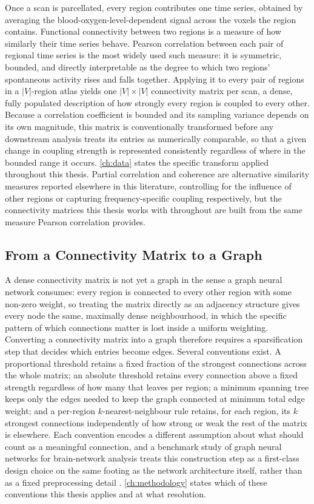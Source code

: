 Once a scan is parcellated, every region contributes one time series, obtained by
averaging the blood-oxygen-level-dependent signal across the voxels the region contains.
Functional connectivity between two regions is a measure of how similarly their time
series behave. Pearson correlation between each pair of regional time series is the most
widely used such measure: it is symmetric, bounded, and directly interpretable as the
degree to which two regions' spontaneous activity rises and falls together. Applying it to
every pair of regions in a $|V|$-region atlas yields one $|V| \times |V|$ connectivity
matrix per scan, a dense, fully populated description of how strongly every region is
coupled to every other. Because a correlation coefficient is bounded and its sampling
variance depends on its own magnitude, this matrix is conventionally transformed before
any downstream analysis treats its entries as numerically comparable, so that a given
change in coupling strength is represented consistently regardless of where in the bounded
range it occurs. \autoref{ch:data} states the specific transform applied throughout this
thesis. Partial correlation and coherence are alternative similarity measures reported
elsewhere in this literature, controlling for the influence of other regions or capturing
frequency-specific coupling respectively, but the connectivity matrices this thesis works
with throughout are built from the same measure Pearson correlation provides.

\subsection{From a Connectivity Matrix to a Graph}\label{sec:graph-construction-background}

A dense connectivity matrix is not yet a graph in the sense a graph neural network
consumes: every region is connected to every other region with some non-zero weight, so
treating the matrix directly as an adjacency structure gives every node the same,
maximally dense neighbourhood, in which the specific pattern of which connections matter
is lost inside a uniform weighting. Converting a connectivity matrix into a graph
therefore requires a sparsification step that decides which entries become edges. Several
conventions exist. A proportional threshold retains a fixed fraction of the strongest
connections across the whole matrix; an absolute threshold retains every connection above
a fixed strength regardless of how many that leaves per region; a minimum spanning tree
keeps only the edges needed to keep the graph connected at minimum total edge weight; and a
per-region $k$-nearest-neighbour rule retains, for each region, its $k$ strongest
connections independently of how strong or weak the rest of the matrix is elsewhere. Each
convention encodes a different assumption about what should count as a meaningful
connection, and a benchmark study of graph neural networks for brain-network analysis
treats this construction step as a first-class design choice on the same footing as the
network architecture itself, rather than as a fixed preprocessing detail
\parencite{cui2023braingb}. \autoref{ch:methodology} states which of these conventions this
thesis applies and at what resolution.

